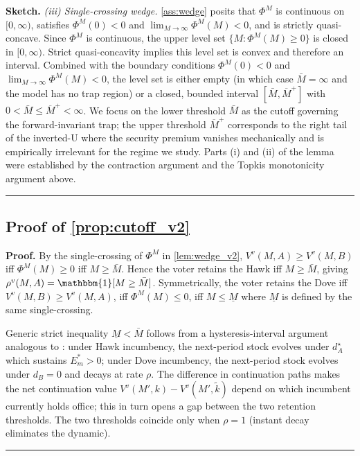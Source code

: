 \documentclass[11pt,twoside]{extarticle}
\newenvironment{proof}[1][Proof]{\noindent \textbf{#1.} }{\ \rule{0.5em}{0.5em}}
\begin{document}
\begin{proof}[Sketch]
\textit{(iii) Single-crossing wedge.} \autoref{ass:wedge} posits that
$\Phi^M$ is continuous on $[0, \infty)$, satisfies $\Phi^M(0) < 0$ and
$\lim_{M\to\infty}\Phi^M(M) < 0$, and is strictly quasi-concave. Since
$\Phi^M$ is continuous, the upper level set
$\{M : \Phi^M(M) \ge 0\}$ is closed in $[0, \infty)$. Strict
quasi-concavity implies this level set is convex and therefore an
interval. Combined with the boundary conditions $\Phi^M(0) < 0$ and
$\lim_{M\to\infty}\Phi^M(M) < 0$, the level set is either empty (in which
case $\bar M = \infty$ and the model has no trap region) or a closed,
bounded interval $[\bar M, \overline M^+]$ with $0 < \bar M \le \overline M^+ < \infty$.
We focus on the lower threshold $\bar M$ as the cutoff governing the
forward-invariant trap; the upper threshold $\overline M^+$ corresponds to
the right tail of the inverted-U where the security premium vanishes
mechanically and is empirically irrelevant for the regime we study.
Parts (i) and (ii) of the lemma were established by the contraction
argument and the Topkis monotonicity argument above.
\end{proof}

\subsection*{Proof of \autoref{prop:cutoff_v2}} \label{app:proof:cutoff_v2}

\begin{proof}
By the single-crossing of $\Phi^M$ in \autoref{lem:wedge_v2}, $V^v(M, A) \ge V^v(M, B)$
iff $\Phi^M(M) \ge 0$ iff $M \ge \bar M$. Hence the voter retains the
Hawk iff $M \ge \bar M$, giving $\rho^v(M, A) = \mathbbm{1}[M \ge \bar M]$.
Symmetrically, the voter retains the Dove iff $V^v(M, B) \ge V^v(M, A)$,
iff $\Phi^M(M) \le 0$, iff $M \le \underline M$ where $\underline M$ is
defined by the same single-crossing.

Generic strict inequality $\underline M < \bar M$ follows from a
hysteresis-interval argument analogous to
\citet{coatePolicyPersistence1999}: under Hawk incumbency, the next-period
stock evolves under $d_A^\star$ which sustains $E_m^* > 0$; under Dove
incumbency, the next-period stock evolves under $d_B = 0$ and decays at
rate $\rho$. The difference in continuation paths makes the net continuation
value $V^v(M', k) - V^v(M', \tilde k)$ depend on which incumbent currently
holds office; this in turn opens a gap between the two retention thresholds.
The two thresholds coincide only when $\rho = 1$ (instant decay eliminates
the dynamic).
\end{proof}
\end{document}
